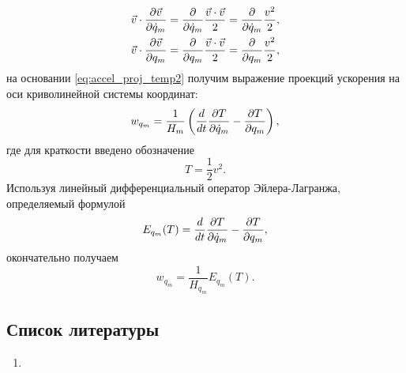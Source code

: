 \begin{equation*}
  \begin{gathered}
    \dotprod{\vec{v}}{\parder[\vec{v}]{\dot{q}_m}} =
      \parder{\dot{q}_m} \frac{\dotprod{\vec{v}}{\vec{v}}}{2} =
      \parder{\dot{q}_m} \frac{v^2}{2}, \\
    \dotprod{\vec{v}}{\parder[\vec{v}]{q_m}} =
      \parder{q_m} \frac{\dotprod{\vec{v}}{\vec{v}}}{2} =
      \parder{q_m} \frac{v^2}{2},
  \end{gathered}
\end{equation*}
на основании \autoref{eq:accel_proj_temp2} получим выражение проекций ускорения
на оси криволинейной системы координат:
\begin{equation}
  w_{q_m} = \frac{1}{H_m} \paren{\dt \parder[T]{\dot{q}_m} - \parder[T]{q_m}},
\end{equation}
где для краткости введено обозначение
\begin{equation}
  T = \frac{1}{2} v^2.
\end{equation}
Используя линейный дифференциальный оператор Эйлера-Лагранжа, определяемый
формулой
\begin{equation}
  E_{q_m}(T) = \dt \parder[T]{\dot{q}_m} - \parder[T]{q_m},
\end{equation}
окончательно получаем
\begin{equation}
  \label{eq:accel_proj}
  w_{q_m} = \frac{1}{H_{q_m}} E_{q_m}(T).
\end{equation}

\subsection{Список литературы}
\begin{enumerate}
  \item \cite{lourie}
\end{enumerate}

